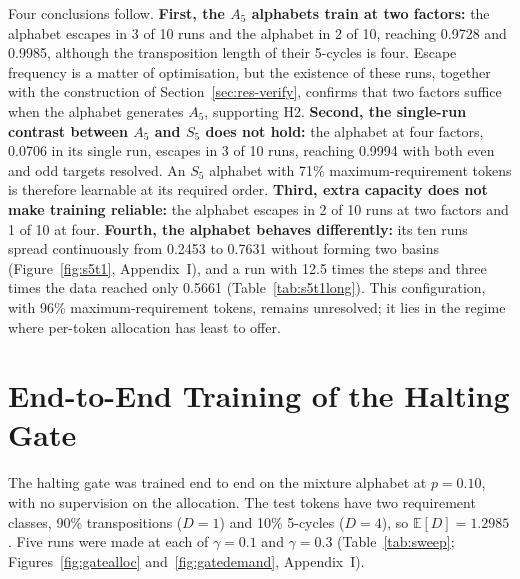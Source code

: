 Four conclusions follow. \textbf{First, the $A_5$ alphabets train at two factors:} the \alA alphabet escapes in 3 of 10 runs and the \alB alphabet in 2 of 10, reaching 0.9728 and 0.9985, although the transposition length of their 5-cycles is four. Escape frequency is a matter of optimisation, but the existence of these runs, together with the construction of Section~\ref{sec:res-verify}, confirms that two factors suffice when the alphabet generates $A_5$, supporting H2. \textbf{Second, the single-run contrast between $A_5$ and $S_5$ does not hold:} the \alE alphabet at four factors, 0.0706 in its single run, escapes in 3 of 10 runs, reaching 0.9994 with both even and odd targets resolved. An $S_5$ alphabet with 71\% maximum-requirement tokens is therefore learnable at its required order. \textbf{Third, extra capacity does not make training reliable:} the \alB alphabet escapes in 2 of 10 runs at two factors and 1 of 10 at four. \textbf{Fourth, the \alD alphabet behaves differently:} its ten runs spread continuously from 0.2453 to 0.7631 without forming two basins (Figure~\ref{fig:s5t1}, Appendix~I), and a run with 12.5 times the steps and three times the data reached only 0.5661 (Table~\ref{tab:s5t1long}). This configuration, with 96\% maximum-requirement tokens, remains unresolved; it lies in the regime where per-token allocation has least to offer.

\section{End-to-End Training of the Halting Gate}
\label{sec:res-gate}
The halting gate was trained end to end on the mixture alphabet at $p = 0.10$, with no supervision on the allocation. The test tokens have two requirement classes, 90\% transpositions ($D=1$) and 10\% 5-cycles ($D=4$), so $\mathbb{E}[D] = 1.2985$. Five runs were made at each of $\gamma = 0.1$ and $\gamma = 0.3$ (Table~\ref{tab:sweep}; Figures~\ref{fig:gatealloc} and~\ref{fig:gatedemand}, Appendix~I).

